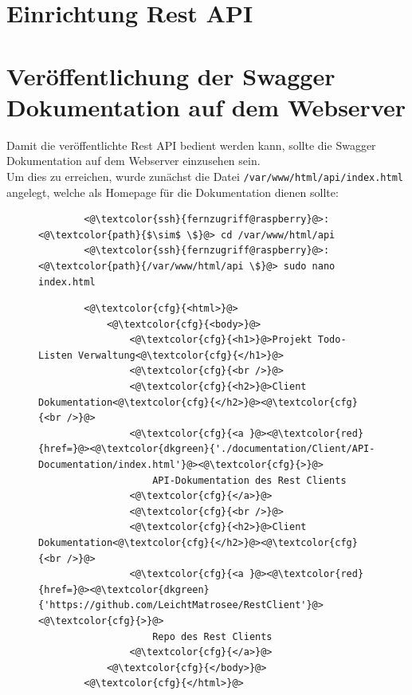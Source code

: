 \documentclass[a4paper, 11pt]{scrartcl}
\begin{document}
\section{Einrichtung Rest API}



\section{Veröffentlichung der Swagger Dokumentation auf dem Webserver}
Damit die veröffentlichte Rest API bedient werden kann, sollte die Swagger Dokumentation auf dem Webserver einzusehen sein.
\\
Um dies zu erreichen, wurde zunächst die Datei \lstinline[basicstyle={\small\ttfamily\color{black}}]|/var/www/html/api/index.html| angelegt, welche als Homepage für die Dokumentation
dienen sollte:
\begin{figure}[H]
    \begin{mdframed}[backgroundcolor=bbg]
        \begin{lstlisting}
        <@\textcolor{ssh}{fernzugriff@raspberry}@>:<@\textcolor{path}{$\sim$ \$}@> cd /var/www/html/api
        <@\textcolor{ssh}{fernzugriff@raspberry}@>:<@\textcolor{path}{/var/www/html/api \$}@> sudo nano index.html
        \end{lstlisting}
    \end{mdframed}
    \label{lst:doc_nano}
\end{figure}
\begin{figure}[H]
    \begin{mdframed}[backgroundcolor=bbg]
        \begin{lstlisting}
        <@\textcolor{cfg}{<html>}@>
            <@\textcolor{cfg}{<body>}@>
                <@\textcolor{cfg}{<h1>}@>Projekt Todo-Listen Verwaltung<@\textcolor{cfg}{</h1>}@>
                <@\textcolor{cfg}{<br />}@>
                <@\textcolor{cfg}{<h2>}@>Client Dokumentation<@\textcolor{cfg}{</h2>}@><@\textcolor{cfg}{<br />}@>
                <@\textcolor{cfg}{<a }@><@\textcolor{red}{href=}@><@\textcolor{dkgreen}{'./documentation/Client/API-Documentation/index.html'}@><@\textcolor{cfg}{>}@>
                    API-Dokumentation des Rest Clients
                <@\textcolor{cfg}{</a>}@>
                <@\textcolor{cfg}{<br />}@>
                <@\textcolor{cfg}{<h2>}@>Client Dokumentation<@\textcolor{cfg}{</h2>}@><@\textcolor{cfg}{<br />}@>
                <@\textcolor{cfg}{<a }@><@\textcolor{red}{href=}@><@\textcolor{dkgreen}{'https://github.com/LeichtMatrosee/RestClient'}@><@\textcolor{cfg}{>}@>
                    Repo des Rest Clients
                <@\textcolor{cfg}{</a>}@>
            <@\textcolor{cfg}{</body>}@>
        <@\textcolor{cfg}{</html>}@>
        \end{lstlisting}
    \end{mdframed}
    \label{lst:index_apache2}
\end{figure}
\end{document}
